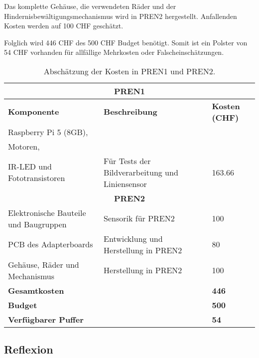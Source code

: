 \documentclass[../main.tex]{subfiles}
\begin{document}
Das komplette Gehäuse, die verwendeten Räder und der Hindernisbewältigungsmechanismus wird in PREN2 hergestellt. Anfallenden Kosten werden auf 100 CHF geschätzt.

Folglich wird 446 CHF des 500 CHF Budget benötigt. Somit ist ein Polster von 54 CHF vorhanden für allfällige Mehrkosten oder Falscheinschätzungen.

\begin{table}[h!]
    \centering
    \begin{tabular}{|p{5cm}|p{5cm}|p{3cm}|}
        \hline
        \multicolumn{3}{|c|}{\textbf{PREN1}} \\
        \hline
        \textbf{Komponente} & \textbf{Beschreibung} & \textbf{Kosten (CHF)} \\
        \hline
        Raspberry Pi 5 (8GB), \\ Motoren, \\ IR-LED und Fototransistoren & Für Tests der Bildverarbeitung und Liniensensor & 163.66 \\
        \hline
        \multicolumn{3}{|c|}{\textbf{PREN2}} \\
        \hline
        Elektronische Bauteile und Baugruppen & Sensorik für PREN2 & 100 \\
        \hline
        PCB des Adapterboards & Entwicklung und Herstellung in PREN2 & 80 \\
        \hline
        Gehäuse, Räder und Mechanismus & Herstellung in PREN2 & 100 \\
        \hline
        \textbf{Gesamtkosten} & & \textbf{446} \\
        \hline
        \textbf{Budget} & & \textbf{500} \\
        \hline
        \textbf{Verfügbarer Puffer} & & \textbf{54} \\
        \hline
    \end{tabular}
    \caption{Abschätzung der Kosten in PREN1 und PREN2.}
    \label{tab:kostenuebersicht}
\end{table}

\subsection{Reflexion}
\end{document}
